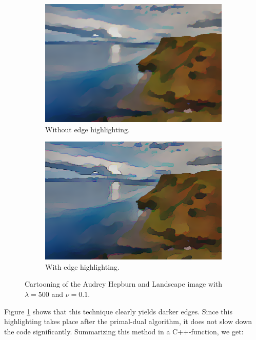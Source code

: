 \documentclass[abstracton]{scrreprt}
\begin{document}
\begin{figure}[!ht]
\begin{subfigure}[b]{0.32\textwidth}
                    \includegraphics[width=\textwidth]{img/cartooning/best_pwc_landscape.png}
                    \caption{Without edge highlighting.}
                \end{subfigure}
                \begin{subfigure}[b]{0.32\textwidth}
                    \includegraphics[width=\textwidth]{img/cartooning/best_pwc_landscape_eh.png}
                    \caption{With edge highlighting.}
                \end{subfigure}
                \caption[Cartooning example of Audrey Hepburn and Landscape image.]{Cartooning of the Audrey Hepburn and Landscape image with $\lambda = 500$ and $\nu = 0.1$.}
            \label{fig:cartooning_hepburn_and_landscaperealtime}
            \end{figure}
        Figure \ref{fig:cartooning_hepburn_and_landscaperealtime} shows that this technique clearly yields darker edges. Since this highlighting takes place after the primal-dual algorithm, it does not slow down the code significantly. Summarizing this method in a C++-function, we get:
\end{document}
